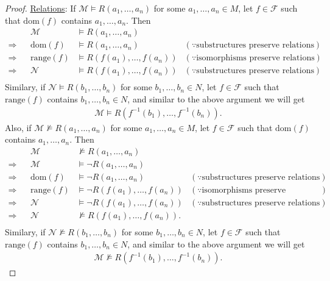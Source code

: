 \documentclass{article}
\begin{document}
\begin{enumerate}[label={\bf Q\arabic*:}]
\begin{proof}
      \underline{Relations}: If $\mathcal{M}\models R(a_1,\ldots,a_n)$ for
      some $a_1,\ldots,a_n\in M$, let $f\in\mathcal{F}$ such that
      $\text{dom}(f)$ contains $a_1,\ldots,a_n$. Then
      \begin{align*}
                    && \mathcal{M}     &\models R(a_1,\ldots,a_n)  & \\
        \Rightarrow && \text{dom}(f)   &\models R(a_1,\ldots,a_n)
                    & (\because\text{substructures preserve relations}) \\
        \Rightarrow && \text{range}(f)
                    & \models R(f(a_1),\ldots,f(a_n))
                    & (\because\text{isomorphisms preserve relations}) \\
        \Rightarrow && \mathcal{N}
                    & \models R(f(a_1),\ldots,f(a_n))
                    & (\because\text{substructures preserve relations}). \\
      \end{align*}
      Similary, if $\mathcal{N}\models R(b_1,\ldots,b_n)$ for some
      $b_1,\ldots,b_n\in N$, let $f\in\mathcal{F}$ such that
      $\text{range}(f)$ contains $b_1,\ldots,b_n\in N$, and similar to
      the above argument we will get
      \begin{align*}
        \mathcal{M}\models R(f^{-1}(b_1),\ldots,f^{-1}(b_n)).
      \end{align*}
      Also, if $\mathcal{M}\not\models R(a_1,\ldots,a_n)$ for
      some $a_1,\ldots,a_n\in M$, let $f\in\mathcal{F}$ such that
      $\text{dom}(f)$ contains $a_1,\ldots,a_n$. Then
      \begin{align*}
                    && \mathcal{M}     &\not\models R(a_1,\ldots,a_n)  & \\
        \Rightarrow && \mathcal{M}     &\models\neg R(a_1,\ldots,a_n)  & \\
        \Rightarrow && \text{dom}(f)   &\models\neg R(a_1,\ldots,a_n)
                    & (\because\text{substructures preserve relations}) \\
        \Rightarrow && \text{range}(f)
                    & \models\neg R(f(a_1),\ldots,f(a_n))
                    & (\because\text{isomorphisms preserve relations}) \\
        \Rightarrow && \mathcal{N}
                    & \models\neg R(f(a_1),\ldots,f(a_n))
                    & (\because\text{substructures preserve relations}) \\
        \Rightarrow && \mathcal{N}
                    & \not\models R(f(a_1),\ldots,f(a_n)). & \\
      \end{align*}
      Similary, if $\mathcal{N}\not\models R(b_1,\ldots,b_n)$ for some
      $b_1,\ldots,b_n\in N$, let $f\in\mathcal{F}$ such that
      $\text{range}(f)$ contains $b_1,\ldots,b_n\in N$, and similar to
      the above argument we will get
      \begin{align*}
        \mathcal{M}\not\models R(f^{-1}(b_1),\ldots,f^{-1}(b_n)).
      \end{align*}


\end{proof}
\end{enumerate}
\end{document}
